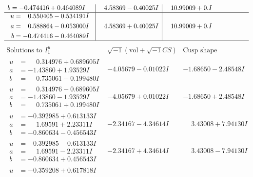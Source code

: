 \documentclass[1p]{elsarticle_modified}
\theoremstyle{definition}
\newcommand{\I}{\sqrt{-1}}
\begin{document}
$$\begin{array}{c|c|c}
\begin{aligned}
b &= -0.474416 + 0.464089 I\end{aligned}
 & \phantom{-}4.58369 - 0.40025 I & \phantom{-}10.99009 + 0. I\phantom{ +0.000000I} \\ \hline\begin{aligned}
u &= \phantom{-}0.550405 - 0.534191 I \\
a &= \phantom{-}0.588864 - 0.053000 I \\
b &= -0.474416 - 0.464089 I\end{aligned}
 & \phantom{-}4.58369 + 0.40025 I & \phantom{-}10.99009 + 0. I\phantom{ +0.000000I}\\
 \hline 
 \end{array}$$\newpage$$\begin{array}{c|c|c}  
\text{Solutions to }I^u_{1}& \I (\text{vol} + \sqrt{-1}CS) & \text{Cusp shape}\\
 \hline 
\begin{aligned}
u &= \phantom{-}0.314976 + 0.689605 I \\
a &= -1.43860 + 1.93529 I \\
b &= \phantom{-}0.735061 - 0.199480 I\end{aligned}
 & -4.05679 - 0.01022 I & -1.68650 - 2.48548 I \\ \hline\begin{aligned}
u &= \phantom{-}0.314976 - 0.689605 I \\
a &= -1.43860 - 1.93529 I \\
b &= \phantom{-}0.735061 + 0.199480 I\end{aligned}
 & -4.05679 + 0.01022 I & -1.68650 + 2.48548 I \\ \hline\begin{aligned}
u &= -0.392985 + 0.613133 I \\
a &= \phantom{-}1.69591 + 2.23311 I \\
b &= -0.860634 - 0.456543 I\end{aligned}
 & -2.34167 - 4.34614 I & \phantom{-}3.43008 + 7.94130 I \\ \hline\begin{aligned}
u &= -0.392985 - 0.613133 I \\
a &= \phantom{-}1.69591 - 2.23311 I \\
b &= -0.860634 + 0.456543 I\end{aligned}
 & -2.34167 + 4.34614 I & \phantom{-}3.43008 - 7.94130 I \\ \hline\begin{aligned}
u &= -0.359208 + 0.617818 I \\

\end{aligned}
\end{array}$$
\end{document}
